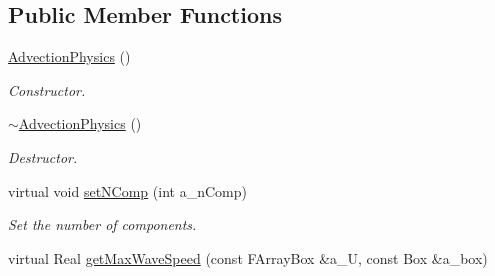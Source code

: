 \subsection*{Public Member Functions}
\begin{DoxyCompactItemize}
\item 
\hypertarget{class_advection_physics_ac392278448ed29a685f9562f709a5b4b}{\hyperlink{class_advection_physics_ac392278448ed29a685f9562f709a5b4b}{Advection\-Physics} ()}\label{class_advection_physics_ac392278448ed29a685f9562f709a5b4b}

\begin{DoxyCompactList}\small\item\em Constructor. \end{DoxyCompactList}\item 
\hypertarget{class_advection_physics_a90f848be0b676fed24227e782aec2eb6}{\hyperlink{class_advection_physics_a90f848be0b676fed24227e782aec2eb6}{$\sim$\-Advection\-Physics} ()}\label{class_advection_physics_a90f848be0b676fed24227e782aec2eb6}

\begin{DoxyCompactList}\small\item\em Destructor. \end{DoxyCompactList}\item 
\hypertarget{class_advection_physics_ad50a0a57026615c8d7fd14d8e523f463}{virtual void \hyperlink{class_advection_physics_ad50a0a57026615c8d7fd14d8e523f463}{set\-N\-Comp} (int a\-\_\-n\-Comp)}\label{class_advection_physics_ad50a0a57026615c8d7fd14d8e523f463}

\begin{DoxyCompactList}\small\item\em Set the number of components. \end{DoxyCompactList}\item 
\hypertarget{class_advection_physics_a4305b9cac37f64a32c3db11a28068944}{virtual Real \hyperlink{class_advection_physics_a4305b9cac37f64a32c3db11a28068944}{get\-Max\-Wave\-Speed} (const F\-Array\-Box \&a\-\_\-\-U, const Box \&a\-\_\-box)}\label{class_advection_physics_a4305b9cac37f64a32c3db11a28068944}


\end{DoxyCompactItemize}
